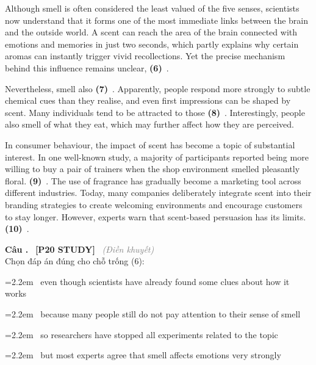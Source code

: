 \documentclass[12pt,a4paper,twoside]{article}
\newcounter{qcounter}
\newcommand{\question}[2][]{%
    \stepcounter{qcounter}%
    \par\vspace{6pt}%
    \noindent\textcolor{primaryBlue}{\textbf{Câu \theqcounter.}}~%
    \textcolor{secondaryBlue}{\small\textbf{[P20 STUDY]}}~%
    \if\relax\detokenize{#1}\relax\else\textcolor{gray}{\small\textit{(#1)}}~\fi\\[1pt]
    \noindent #2%
}
\newcommand{\choiceitem}[2]{%
    \tikz[baseline=-0.5ex]{%
        \node[draw=primaryBlue, circle, minimum size=1.5em, inner sep=0pt, thick] {\textbf{#1}};%
    }~#2%
}
\newenvironment{readingpassage}[1][]{%
    \begin{tcolorbox}[enhanced, colback=grayLight, colframe=secondaryBlue,
        coltitle=textDark, fonttitle=\bfseries, title={#1},
        rounded corners, arc=3mm, boxrule=1pt,
        left=15pt, right=15pt, top=10pt, bottom=10pt,
        breakable, before skip=10pt, after skip=10pt, drop fuzzy shadow]
    \setstretch{1.3}
}{\end{tcolorbox}}
\begin{document}
\begin{readingpassage}[]
Although smell is often considered the least valued of the five senses, scientists now understand that it forms one of the most immediate links between the brain and the outside world. A scent can reach the area of the brain connected with emotions and memories in just two seconds, which partly explains why certain aromas can instantly trigger vivid recollections. Yet the precise mechanism behind this influence remains unclear, \textbf{(6)}~\underline{\hspace{1.3cm}}.

Nevertheless, smell also \textbf{(7)}~\underline{\hspace{1.3cm}}. Apparently, people respond more strongly to subtle chemical cues than they realise, and even first impressions can be shaped by scent. Many individuals tend to be attracted to those \textbf{(8)}~\underline{\hspace{1.3cm}}. Interestingly, people also smell of what they eat, which may further affect how they are perceived.

In consumer behaviour, the impact of scent has become a topic of substantial interest. In one well-known study, a majority of participants reported being more willing to buy a pair of trainers when the shop environment smelled pleasantly floral. \textbf{(9)}~\underline{\hspace{1.3cm}}. The use of fragrance has gradually become a marketing tool across different industries. Today, many companies deliberately integrate scent into their branding strategies to create welcoming environments and encourage customers to stay longer. However, experts warn that scent-based persuasion has its limits. \textbf{(10)}~\underline{\hspace{1.3cm}}.
\end{readingpassage}

\question[Điền khuyết]{Chọn đáp án đúng cho chỗ trống (6):}

\par\vspace{4pt}
\noindent\hangindent=2.2em\choiceitem{A}{even though scientists have already found some clues about how it works}\par\vspace{4pt}
\noindent\hangindent=2.2em\choiceitem{B}{because many people still do not pay attention to their sense of smell}\par\vspace{4pt}
\noindent\hangindent=2.2em\choiceitem{C}{so researchers have stopped all experiments related to the topic}\par\vspace{4pt}
\noindent\hangindent=2.2em\choiceitem{D}{but most experts agree that smell affects emotions very strongly}\par\vspace{4pt}
\end{document}
